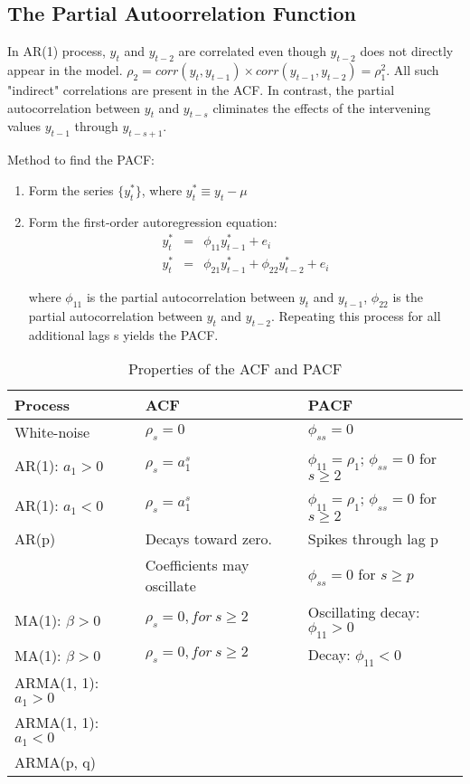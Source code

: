 \subsection{The Partial Autoorrelation Function}
In AR(1) process, $y_{t}$ and $y_{t-2}$ are correlated even though $y_{t-2}$ does not directly appear in the model. $\rho_{2}=corr(y_{t}, y_{t-1})\times corr(y_{t-1}, y_{t-2})=\rho_{1}^{2}$. All such "indirect" correlations are present in the ACF. In contrast, the partial autocorrelation between $y_{t}$ and $y_{t-s}$ climinates the effects of the intervening values $y_{t-1}$ through $y_{t-s+1}$.

Method to find the PACF:
\begin{enumerate}
\item Form the series $\{y_{t}^{\ast}\}$, where $y_{t}^{\ast}\equiv y_{t}-\mu$
\item Form the first-order autoregression equation:
	\begin{eqnarray*}
	y_{t}^{\ast}&=&\phi_{11}y_{t-1}^{\ast}+e_{i}\\
	y_{t}^{\ast}&=&\phi_{21}y_{t-1}^{\ast}+\phi_{22}y_{t-2}^{\ast}+e_{i}
	\end{eqnarray*}

where $\phi_{11}$ is the partial autocorrelation between $y_{t}$ and $y_{t-1}$, $\phi_{22}$ is the partial autocorrelation between $y_{t}$ and $y_{t-2}$. Repeating this process for all additional lags s yields the PACF.
\end{enumerate}

\begin{table}[!h]
\caption{Properties of the ACF and PACF}
\label{acf}
\begin{center}
\begin{tabular}{lll}\hline
Process		&		ACF		&PACF\\ \hline
White-noise& 	$\rho_{s}=0$&$\phi_{ss}=0$\\
AR(1): $a_{1}>0$&$\rho_{s}=a_{1}^{s}$ 	&$\phi_{11}=\rho_{1}$; $\phi_{ss}=0$ for $s\geq2$\\
AR(1): $a_{1}<0$&$\rho_{s}=a_{1}^{s}$ 	&$\phi_{11}=\rho_{1}$; $\phi_{ss}=0$ for $s\geq2$\\
AR(p)&Decays toward zero.  	&Spikes through lag p\\
	&Coefficients may oscillate&$\phi_{ss}=0$ for $s\geq p$\\
MA(1): $\beta>0$& $\rho_{s}=0, for \ s\geq 2$&Oscillating decay: $\phi_{11}>0$\\
MA(1): $\beta>0$& $\rho_{s}=0, for \ s\geq 2$&Decay: $\phi_{11}<0$ \\
ARMA(1, 1): $a_{1}>0$& 	&\\
ARMA(1, 1): $a_{1}<0$& 	&\\
ARMA(p, q)& 	&\\
\hline
\end{tabular}
\end{center}
\end{table}


